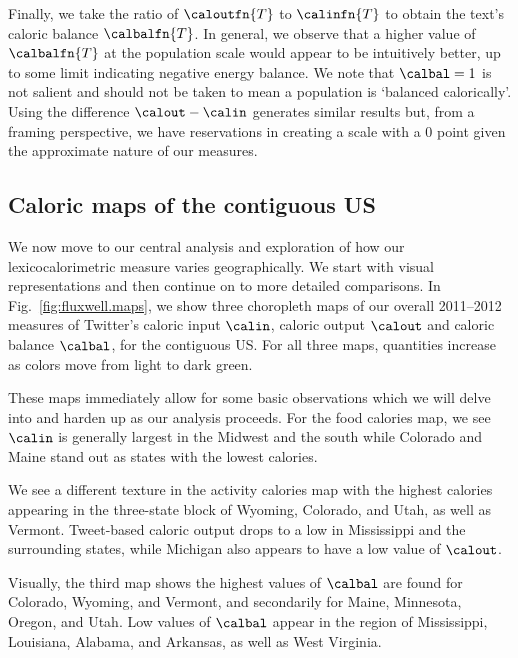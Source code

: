 Finally, we take the ratio of $\caloutfn{T}$ to $\calinfn{T}$
to obtain the text's caloric balance
$\calbalfn{T}$.
In general, we observe that 
a higher value of $\calbalfn{T}$ at the population scale 
would appear to be intuitively better, up to some limit 
indicating negative energy balance.
We note that $\calbal = 1$ is not salient and
should not be taken to mean a population is `balanced calorically'.
Using the difference $\calout - \calin$ generates
similar results but, from a framing perspective,
we have reservations in creating a scale with a 0 point
given the approximate nature of our measures.

\subsection*{Caloric maps of the contiguous US}
\label{subsec:fluxwell.maps}





We now move to our central analysis and exploration of 
how our lexicocalorimetric measure varies geographically.
We start with visual representations
and then continue on to more detailed comparisons.
In Fig.~\ref{fig:fluxwell.maps},
we show three choropleth maps 
of our overall 2011--2012 measures
of Twitter's
caloric input $\calin$,
caloric output $\calout$
and
caloric balance $\calbal$,
for the contiguous US.
For all three maps, quantities increase as colors move from 
light to dark green.

These maps immediately allow for some basic observations
which we will delve into and harden up as our analysis proceeds.
For the food calories map, we see $\calin$
is generally largest in the Midwest and the south
while Colorado and Maine stand out as states with
the lowest calories.

We see a different texture in the activity calories 
map with the highest calories appearing in the
three-state block of Wyoming, Colorado, and Utah, as well as Vermont.
Tweet-based caloric output drops to a low in Mississippi
and the surrounding states, while Michigan also
appears to have a low value of $\calout$.

Visually, the third map shows the highest values of $\calbal$ 
are found for Colorado, Wyoming, and Vermont, 
and secondarily for Maine, Minnesota, Oregon, and Utah.
Low values of $\calbal$ appear in the region of
Mississippi, Louisiana, Alabama, and Arkansas,
as well as West Virginia.

